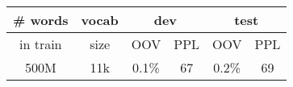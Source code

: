 \begin{table}[!ht]
\captionsetup{font=Large}
\setlength{\tabcolsep}{0.9em}
\centering
\begin{tabular}{|c|c|c|c|c|c|} 
\hline
\# words & vocab & \multicolumn{2}{c|}{dev} & \multicolumn{2}{c|}{test}  \\ 
\hline
in train & size  & OOV   & PPL              & OOV   & PPL                \\ 
\hline
500M     & 11k   & 0.1\% & 67               & 0.2\% & 69                 \\
\hline
\end{tabular}
\caption{}
\label{table:LM_stats}
\end{table}
